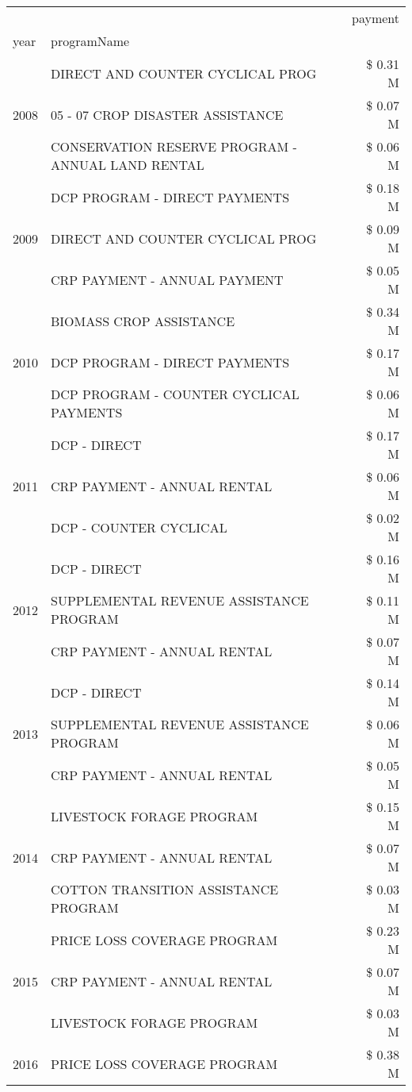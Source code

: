 \begin{tabular}{llr}
\toprule
 &  & payment \\
year & programName &  \\
\midrule
\multirow[t]{3}{*}{2008} & DIRECT AND COUNTER CYCLICAL PROG & \$ 0.31 M \\
 & 05 - 07 CROP DISASTER ASSISTANCE & \$ 0.07 M \\
 & CONSERVATION RESERVE PROGRAM - ANNUAL LAND RENTAL & \$ 0.06 M \\
\cline{1-3}
\multirow[t]{3}{*}{2009} & DCP PROGRAM - DIRECT PAYMENTS & \$ 0.18 M \\
 & DIRECT AND COUNTER CYCLICAL PROG & \$ 0.09 M \\
 & CRP PAYMENT - ANNUAL PAYMENT & \$ 0.05 M \\
\cline{1-3}
\multirow[t]{3}{*}{2010} & BIOMASS CROP ASSISTANCE & \$ 0.34 M \\
 & DCP PROGRAM - DIRECT PAYMENTS & \$ 0.17 M \\
 & DCP PROGRAM - COUNTER CYCLICAL PAYMENTS & \$ 0.06 M \\
\cline{1-3}
\multirow[t]{3}{*}{2011} & DCP - DIRECT & \$ 0.17 M \\
 & CRP PAYMENT - ANNUAL RENTAL & \$ 0.06 M \\
 & DCP - COUNTER CYCLICAL & \$ 0.02 M \\
\cline{1-3}
\multirow[t]{3}{*}{2012} & DCP - DIRECT & \$ 0.16 M \\
 & SUPPLEMENTAL REVENUE ASSISTANCE PROGRAM & \$ 0.11 M \\
 & CRP PAYMENT - ANNUAL RENTAL & \$ 0.07 M \\
\cline{1-3}
\multirow[t]{3}{*}{2013} & DCP - DIRECT & \$ 0.14 M \\
 & SUPPLEMENTAL REVENUE ASSISTANCE PROGRAM & \$ 0.06 M \\
 & CRP PAYMENT - ANNUAL RENTAL & \$ 0.05 M \\
\cline{1-3}
\multirow[t]{3}{*}{2014} & LIVESTOCK FORAGE PROGRAM & \$ 0.15 M \\
 & CRP PAYMENT - ANNUAL RENTAL & \$ 0.07 M \\
 & COTTON TRANSITION ASSISTANCE PROGRAM & \$ 0.03 M \\
\cline{1-3}
\multirow[t]{3}{*}{2015} & PRICE LOSS COVERAGE PROGRAM & \$ 0.23 M \\
 & CRP PAYMENT - ANNUAL RENTAL & \$ 0.07 M \\
 & LIVESTOCK FORAGE PROGRAM & \$ 0.03 M \\
\cline{1-3}
\multirow[t]{3}{*}{2016} & PRICE LOSS COVERAGE PROGRAM                   & \$ 0.38 M \\

\end{tabular}
